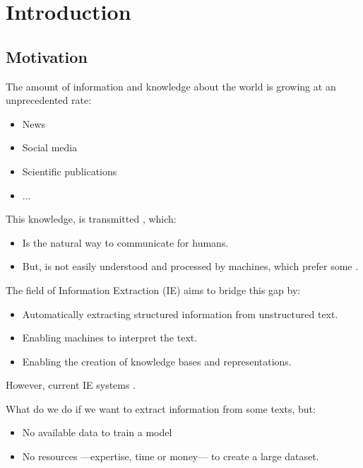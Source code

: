 \documentclass[
    11pt,
    notheorems,
    xcolor={dvipsnames},
    hyperref={
        pdfstartview=FitH, 
        pdftitle={Ikasketa-adibide urriko Informazio-Erauzketa}, 
        pdfauthor={Oscar Sainz Jimenez}, 
        citecolor=secondary, 
    }
]{beamer}
\begin{document}
\section{Introduction}
\subsection{Motivation}

\makesubsectiontitlepage

\begin{frame}

    The amount of information and knowledge about the world is growing at an unprecedented rate:
    \begin{itemize}
        \item News
        \item Social media
        \item Scientific publications
        \item ...
    \end{itemize}
    \blockskip

    This knowledge, is transmitted , which:
    \begin{itemize}
        \item Is the natural way to communicate for humans.
        \item But, is not easily understood and processed by machines, which prefer some .
    \end{itemize}
\end{frame}

\begin{frame}
    The field of Information Extraction (IE) aims to bridge this gap by:
    \begin{itemize}
        \item Automatically extracting structured information from unstructured text.
        \item Enabling machines to interpret the text.
        \item Enabling the creation of knowledge bases and representations.
    \end{itemize}
    \blockskip

    However, current IE systems .
\end{frame}

\begin{frame}

    What do we do if we want to extract information from some texts, but:

    \begin{itemize}
        \item No available data to train a model 
        \item No resources ---expertise, time or money--- to create a large dataset.
    \end{itemize}

\end{frame}
\end{document}
